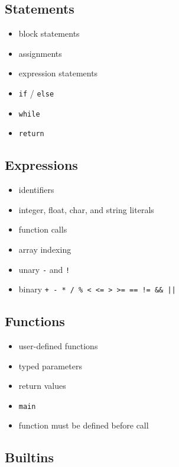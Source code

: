 \documentclass[11pt,a4paper]{article}
\begin{document}
\subsection*{Statements}

\begin{itemize}[leftmargin=2em]
    \item block statements
    \item assignments
    \item expression statements
    \item \texttt{if} / \texttt{else}
    \item \texttt{while}
    \item \texttt{return}
\end{itemize}

\subsection*{Expressions}

\begin{itemize}[leftmargin=2em]
    \item identifiers
    \item integer, float, char, and string literals
    \item function calls
    \item array indexing
    \item unary \texttt{-} and \texttt{!}
    \item binary \texttt{+ - * / \% < <= > >= == != \&\& ||}
\end{itemize}

\subsection*{Functions}

\begin{itemize}[leftmargin=2em]
    \item user-defined functions
    \item typed parameters
    \item return values
    \item \texttt{main}
    \item function must be defined before call
\end{itemize}

\subsection*{Builtins}
\end{document}
